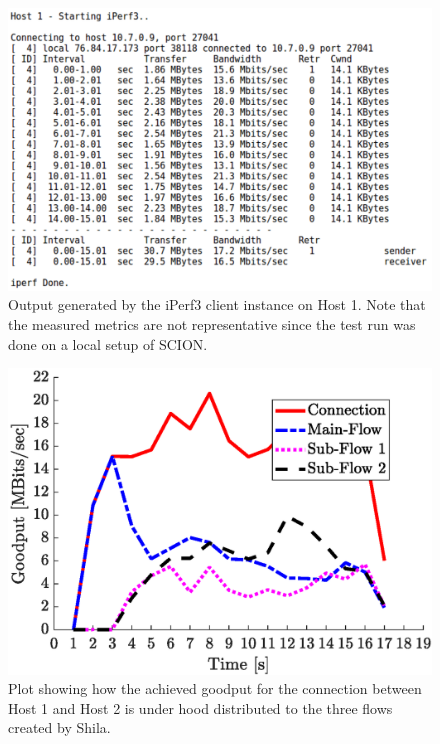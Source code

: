 \begin{figure}
	\begin{center}
		\includegraphics[scale=0.27]{../illustrations/shilaIntroduction/OutputiPerf3Host1.pdf}  
		\caption[Caption for the list of figures.]{Output generated by the iPerf3 client instance on Host 1. Note that the measured metrics are not representative since the test run was done on a local setup of SCION.}
		\label{fig:IntroductionOutputIperfOnHost1}
	\end{center}
\end{figure}

\begin{figure}
	\begin{center}
		\includegraphics[scale=0.65]{../illustrations/shilaIntroduction/DistributionOfFlows.eps}  
		\caption[Caption for the list of figures.]{Plot showing how the achieved goodput for the connection between Host 1 and Host 2 is under hood distributed to the three flows created by Shila.}
		\label{fig:IntroductionDataDistributionAmongPaths}
	\end{center}
\end{figure}


